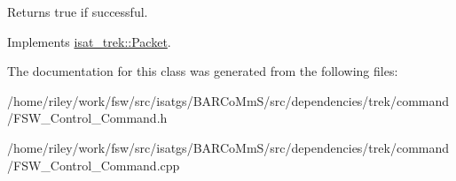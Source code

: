 \begin{DoxyReturn}{Returns}
true if successful. 
\end{DoxyReturn}


Implements \hyperlink{classisat__trek_1_1_packet}{isat\+\_\+trek\+::\+Packet}.



The documentation for this class was generated from the following files\+:\begin{DoxyCompactItemize}
\item 
/home/riley/work/fsw/src/isatgs/\+B\+A\+R\+Co\+Mm\+S/src/dependencies/trek/command/F\+S\+W\+\_\+\+Control\+\_\+\+Command.\+h\item 
/home/riley/work/fsw/src/isatgs/\+B\+A\+R\+Co\+Mm\+S/src/dependencies/trek/command/F\+S\+W\+\_\+\+Control\+\_\+\+Command.\+cpp\end{DoxyCompactItemize}
